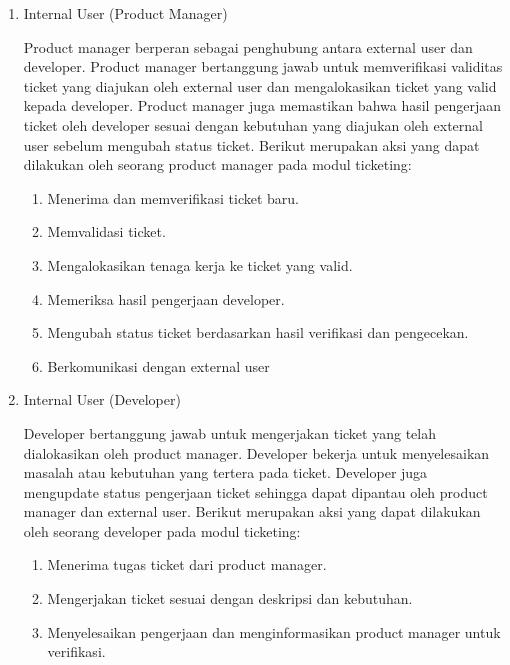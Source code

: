 \documentclass[12pt]{article}
\begin{document}
\begin{enumerate}[label=\textbf{4.\arabic*.}]
\begin{enumerate}[label=\textbf{4.1.\arabic*.}]
\begin{enumerate}[label=\arabic*.]
            \item Internal User (Product Manager)
            
            Product manager berperan sebagai penghubung antara external user dan developer. Product manager bertanggung jawab untuk memverifikasi validitas ticket yang diajukan oleh external user dan mengalokasikan ticket yang valid kepada developer. Product manager juga memastikan bahwa hasil pengerjaan ticket oleh developer sesuai dengan kebutuhan yang diajukan oleh external user sebelum mengubah status ticket. Berikut merupakan aksi yang dapat dilakukan oleh seorang product manager pada modul ticketing:

            \begin{enumerate}
                \item Menerima dan memverifikasi ticket baru.
                \item Memvalidasi ticket.
                \item Mengalokasikan tenaga kerja ke ticket yang valid.
                \item Memeriksa hasil pengerjaan developer.
                \item Mengubah status ticket berdasarkan hasil verifikasi dan pengecekan.
                \item Berkomunikasi dengan external user
            \end{enumerate}

            \item Internal User (Developer)
            
            Developer bertanggung jawab untuk mengerjakan ticket yang telah dialokasikan oleh product manager. Developer bekerja untuk menyelesaikan masalah atau kebutuhan yang tertera pada ticket. Developer juga mengupdate status pengerjaan ticket sehingga dapat dipantau oleh product manager dan external user. Berikut merupakan aksi yang dapat dilakukan oleh seorang developer pada modul ticketing:

            \begin{enumerate}
                \item Menerima tugas ticket dari product manager.
                \item Mengerjakan ticket sesuai dengan deskripsi dan kebutuhan.
                \item Menyelesaikan pengerjaan dan menginformasikan product manager untuk verifikasi.
            \end{enumerate}


\end{enumerate}
\end{enumerate}
\end{enumerate}
\end{document}
